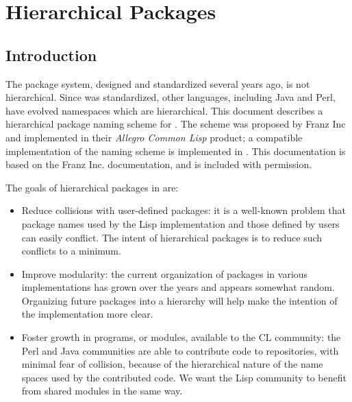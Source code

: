 \section{Hierarchical Packages}


%


\subsection{Introduction}

The \clisp{} package system, designed and standardized several years
ago, is not hierarchical. Since \clisp{} was standardized, other
languages, including Java and Perl, have evolved namespaces which are
hierarchical. This document describes a hierarchical package naming
scheme for \clisp{}. The scheme was proposed by Franz Inc and
implemented in their \textit{Allegro Common Lisp} product; a
compatible implementation of the naming scheme is implemented in
\cmucl{}. This documentation is based on the Franz Inc. documentation,
and is included with permission.

The goals of hierarchical packages in \clisp{} are:

\begin{itemize}
\item
Reduce collisions with user-defined packages: it is a well-known
problem that package names used by the Lisp implementation and those
defined by users can easily conflict. The intent of hierarchical
packages is to reduce such conflicts to a minimum.

\item
Improve modularity: the current organization of packages in various
implementations has grown over the years and appears somewhat random.
Organizing future packages into a hierarchy will help make the
intention of the implementation more clear.

\item 
Foster growth in \clisp{} programs, or modules, available to the CL
community: the Perl and Java communities are able to contribute code
to repositories, with minimal fear of collision, because of the
hierarchical nature of the name spaces used by the contributed code.
We want the Lisp community to benefit from shared modules in the same
way.
\end{itemize}

